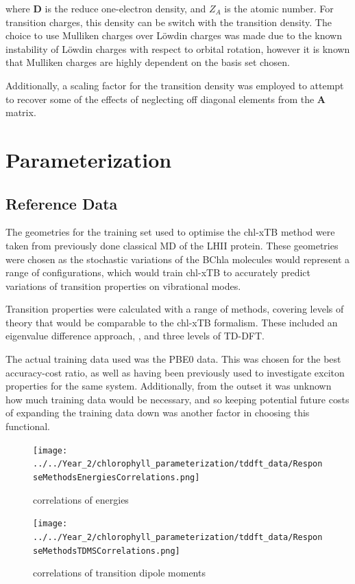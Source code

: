 where $\mathbf{D}$ is the reduce one-electron density, and $Z_A$ is the atomic number.
For transition charges, this density can be switch with the transition density. 
The choice to use Mulliken charges over L{\"o}wdin charges was made due to the known
instability of L{\"o}wdin charges with respect to orbital rotation, however it is
known that Mulliken charges are highly dependent on the basis set chosen. 

Additionally, a scaling factor for the transition density was employed to attempt
to recover some of the effects of neglecting off diagonal elements from the $\mathbf{A}$
matrix.

\afterpartskip
\section{Parameterization}
\label{sec:chl_params}
\subsection{Reference Data}
\label{subsec:ref_data}
The geometries for the training set used to optimise the chl-xTB method were taken
from previously done classical MD of the LHII protein. These geometries were chosen
as the stochastic variations of the BChla molecules would represent a range of
configurations, which would train chl-xTB to accurately predict variations of 
transition properties on vibrational modes.

Transition properties were calculated with a range of methods, covering levels of
theory that would be comparable to the chl-xTB formalism. These included an eigenvalue
difference approach, \dscf, and three levels of TD-DFT. 

The actual training data used was the PBE0 data. This was chosen for the best
accuracy-cost ratio, as well as having been previously used to investigate exciton
properties for the same system. Additionally, from the outset it was unknown how
much training data would be necessary, and so keeping potential future costs of 
expanding the training data down was another factor in choosing this functional.

\begin{figure}
    \texttt{[image: ../../Year\_2/chlorophyll\_parameterization/tddft\_data/ResponseMethodsEnergiesCorrelations.png]}
    \caption{correlations of energies}
\end{figure}

\begin{figure}
    \texttt{[image: ../../Year\_2/chlorophyll\_parameterization/tddft\_data/ResponseMethodsTDMSCorrelations.png]}
    \caption{correlations of transition dipole moments}
\end{figure}


